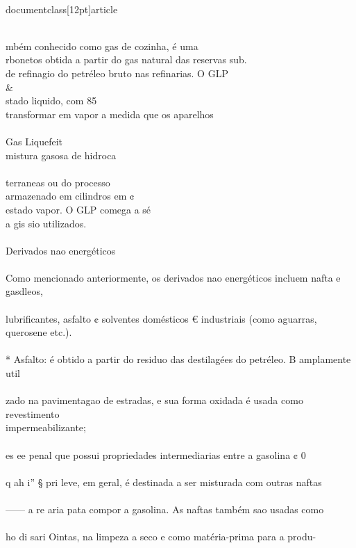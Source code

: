 \\documentclass[12pt]{article}
\begin{document}
\\
mbém conhecido como gas de cozinha, é uma\\
rbonetos obtida a partir do gas natural das reservas sub.\\
de refinagio do petréleo bruto nas refinarias. O GLP \\&\\
stado liquido, com 85\\%
transformar em vapor a medida que os aparelhos\\
\\
Gas Liquefeit\\
mistura gasosa de hidroca\\
\\
terraneas ou do processo\\
armazenado em cilindros em ¢\\
estado vapor. O GLP comega a sé\\
a gis sio utilizados.\\
\\
Derivados nao energéticos\\
\\
Como mencionado anteriormente, os derivados nao energéticos incluem nafta e gasdleos,\\
\\
lubrificantes, asfalto ¢ solventes domésticos € industriais (como aguarras, querosene etc.).\\
\\
* Asfalto: é obtido a partir do residuo das destilagées do petréleo. B amplamente util\\
\\
zado na pavimentagao de estradas, e sua forma oxidada é usada como revestimento\\
impermeabilizante;\\
\\
es ee penal que possui propriedades intermediarias entre a gasolina ¢ 0\\
\\
q ah i” § pri leve, em geral, é destinada a ser misturada com outras naftas\\
\\
—— a re aria pata compor a gasolina. As naftas também sao usadas como\\
\\
ho di sari Ointas, na limpeza a seco e como matéria-prima para a produ-\\
\end{document}
